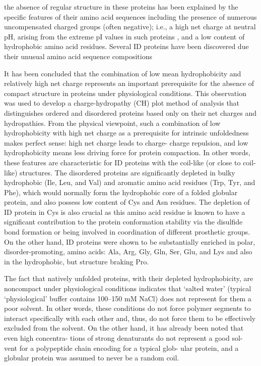
the absence of regular structure in these proteins has been explained by the specific features of their amino acid sequences including the presence of numerous uncompensated charged groups (often negative); 
 i.e., a high net charge at neutral pH, arising from the extreme pI values in such proteins , and a low content of hydrophobic amino acid residues.
Several ID proteins have been discovered due their unusual amino acid sequence compositions

It has been concluded that the combination of low mean hydrophobicity and relatively high net charge represents an important prerequisite for the absence of compact structure in proteins under physiological conditions. This observation was used to develop a charge-hydropathy (CH) plot method of analysis that distinguishes ordered and disordered proteins based only on their net charges and hydropathies.
From the physical viewpoint, such a combination of low hydrophobicity with high net charge as a prerequisite for intrinsic unfoldedness makes perfect sense: high net charge leads to charge-
charge repulsion, and low hydrophobicity means less driving force for protein compaction. In other words, these features are characteristic for ID proteins with the coil-like (or close to coil-
like) structures.
The disordered proteins are significantly depleted in bulky hydrophobic (Ile, Leu, and Val) and aromatic amino acid residues (Trp, Tyr, and Phe), which would normally form the hydrophobic core of a folded globular protein, and also possess low content of Cys and Asn residues.
The depletion of ID protein in Cys is also crucial as this amino acid residue is known to have a significant contribution to the protein conformation stability via the disulfide bond formation or being involved in coordination of different prosthetic groups.
On the other hand, ID proteins were shown to be substantially enriched in polar, disorder-promoting, amino acids: Ala, Arg, Gly, Gln, Ser, Glu, and Lys and also in the hydrophobic, but structure braking Pro.

The fact that natively unfolded proteins, with their depleted hydrophobicity, are noncompact under physiological conditions indicates that ‘salted water’ (typical ‘physiological’ buffer contains 100–150 mM NaCl) does not represent for them a poor solvent.
In other words, these
conditions do not force polymer segments to interact
specifically with each other and, thus, do not force them
to be effectively excluded from the solvent. On the other
hand, it has already been noted that even high concentra-
tions of strong denaturants do not represent a good sol-
vent for a polypeptide chain encoding for a typical glob-
ular protein, and a globular protein was assumed to never
be a random coil.

